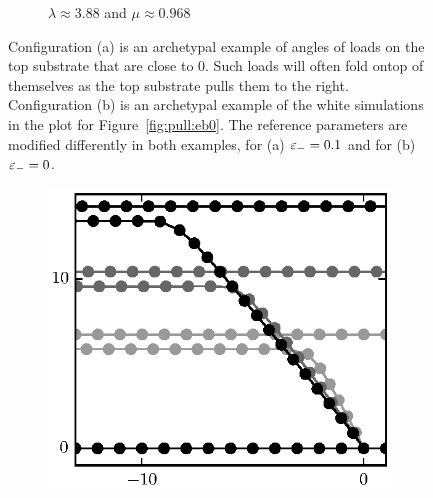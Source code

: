 {\begin{figure}[t]
\begin{subfigure}{.5\textwidth}
         \caption{$\lambda\approx3.88$ and $\mu\approx0.968$\label{subfig:barely_adhered}}
      \end{subfigure}
      \caption{Configuration (a) is an archetypal example of angles of loads on the top substrate that are close to 0. Such loads will often fold ontop of themselves as the top substrate pulls them to the right. Configuration (b) is an archetypal example of the white simulations in the plot for Figure~\ref{fig:pull:eb0}. The reference parameters are modified differently in both examples, for (a) $\varepsilon_-=0.1$ and for (b) $\varepsilon_-=0$.\label{fig:pull_equil}} 
   \end{figure}

   \begin{figure}[t]
      \centering
      \begin{subfigure}{.5\textwidth}
         \centering
         \includegraphics{./fig/ch3/pull/unzip_anim.eps}
         \caption{\label{subfig:unzip}}
      \end{subfigure}%
      ~
      \begin{subfigure}{.5\textwidth}
         \centering

\end{subfigure}
\end{figure}}
